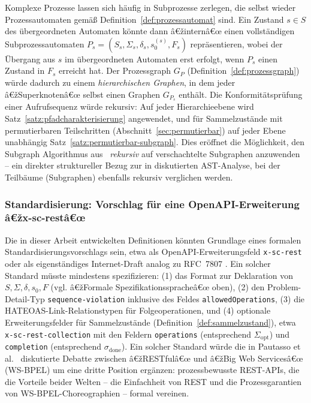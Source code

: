 ﻿\documentclass[a4paper,12pt]{article}
\theoremstyle{definition}
\begin{document}
Komplexe Prozesse lassen sich häufig in Subprozesse zerlegen, die selbst wieder
Prozessautomaten gemäß Definition~\ref{def:prozessautomat} sind. Ein Zustand $s\in S$ des
übergeordneten Automaten könnte dann â€žinternâ€œ einen vollständigen Subprozessautomaten
$P_s=(S_s,\Sigma_s,\delta_s,s_0^{(s)},F_s)$ repräsentieren, wobei der Übergang aus $s$ im
übergeordneten Automaten erst erfolgt, wenn $P_s$ einen Zustand in $F_s$ erreicht hat. Der
Prozessgraph $G_P$ (Definition~\ref{def:prozessgraph}) würde dadurch zu einem
\emph{hierarchischen Graphen}, in dem jeder â€žSuperknotenâ€œ selbst einen Graphen $G_{P_s}$
enthält. Die Konformitätsprüfung einer Aufrufsequenz würde rekursiv: Auf jeder
Hierarchieebene wird Satz~\ref{satz:pfadcharakterisierung} angewendet, und für
Sammelzustände mit permutierbaren Teilschritten (Abschnitt~\ref{sec:permutierbar}) auf
jeder Ebene unabhängig Satz~\ref{satz:permutierbar-subgraph}. Dies eröffnet die
Möglichkeit, den Subgraph Algorithmus aus~\cite{epp2026subgraph} \emph{rekursiv} auf
verschachtelte Subgraphen anzuwenden -- ein direkter struktureller Bezug zur in
\cite{epp2026subgraph} diskutierten AST-Analyse, bei der Teilbäume (Subgraphen)
ebenfalls rekursiv verglichen werden.

\subsubsection{Standardisierung: Vorschlag für eine OpenAPI-Erweiterung â€žx-sc-restâ€œ}

Die in dieser Arbeit entwickelten Definitionen könnten Grundlage eines formalen
Standardisierungsvorschlags sein, etwa als OpenAPI-Erweiterungsfeld
\texttt{x-sc-rest} oder als eigenständiges Internet-Draft analog zu RFC~7807
\cite{rfc7807}. Ein solcher Standard müsste mindestens spezifizieren: (1) das Format zur
Deklaration von $S,\Sigma,\delta,s_0,F$ (vgl. â€žFormale Spezifikationsspracheâ€œ oben), (2)
den Problem-Detail-Typ \texttt{sequence-violation} inklusive des Feldes
\texttt{allowedOperations}, (3) die HATEOAS-Link-Relationstypen für Folgeoperationen, und
(4) optionale Erweiterungsfelder für Sammelzustände (Definition~\ref{def:sammelzustand}),
etwa \texttt{x-sc-rest-collection} mit den Feldern \texttt{operations} (entsprechend
$\Sigma_{\mathrm{opt}}$) und \texttt{completion} (entsprechend $\sigma_{\mathrm{done}}$).
Ein solcher Standard würde die in Pautasso et al.~\cite{pautasso2008} diskutierte Debatte
zwischen â€žRESTfulâ€œ und â€žBig Web Servicesâ€œ (WS-BPEL) um eine dritte Position ergänzen:
prozessbewusste REST-APIs, die die Vorteile beider Welten -- die Einfachheit von REST und
die Prozessgarantien von WS-BPEL-Choreographien -- formal vereinen.
\end{document}
